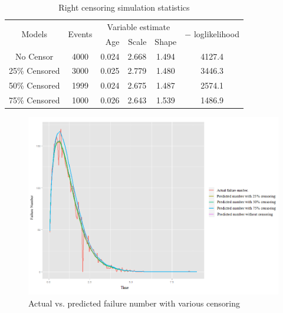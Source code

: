 \begin{table}[htbp]
	\renewcommand{\arraystretch}{1.5}
	\small
	\centering
	\caption{Right censoring simulation statistics}
	\begin{tabular}{ccrrrc}
		\hline
		\multirow{2}[2]{*}{Models} & \multirow{2}[2]{*}{Events} & \multicolumn{3}{c}{Variable estimate} & \multirow{2}[2]{*}{$-$ loglikelihood} \\ \cline{3-5}
		
		&       & Age   & Scale & Shape &  \\\hline
		No Censor & 4000  & \multicolumn{1}{c}{0.024} & \multicolumn{1}{c}{2.668} & \multicolumn{1}{c}{1.494} & 4127.4 \\
		25\% Censored & 3000  & \multicolumn{1}{c}{0.025} & \multicolumn{1}{c}{2.779} & \multicolumn{1}{c}{1.480} & 3446.3 \\
		50\% Censored & 1999  & \multicolumn{1}{c}{0.024} & \multicolumn{1}{c}{2.675} & \multicolumn{1}{c}{1.487} & 2574.1 \\
		75\% Censored & 1000  & \multicolumn{1}{c}{0.026} & \multicolumn{1}{c}{2.643} & \multicolumn{1}{c}{1.539} & 1486.9 \\
		\hline
	\end{tabular}%
	\label{table:rightcensor}%
\end{table}%
\begin{landscape}
\begin{figure}[htbp]
	\centering
	\includegraphics[width=9in]{Fig7}
	\caption{Actual vs. predicted failure number with various censoring}
	\label{fig:7}
\end{figure}
\end{landscape}
